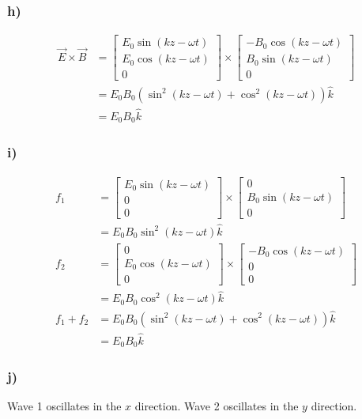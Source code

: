 \documentclass[../homework.tex]{subfiles}
\begin{document}
\subsubsection*{h)}
\begin{align*}
	\vec{E} \times \vec{B} & =
	\begin{bmatrix}
		E_0 \sin (kz - \omega t) \\
		E_0 \cos (kz - \omega t) \\
		0
	\end{bmatrix} \times
	\begin{bmatrix}
		-B_0 \cos (kz - \omega t) \\
		B_0 \sin (kz - \omega t)  \\
		0
	\end{bmatrix}                                                                               \\
	                       & = E_0 B_0 \left(\sin^2 (kz - \omega t) + \cos^2 (kz - \omega t)\right) \hat{k} \\
	                       & = E_0 B_0 \hat{k}
\end{align*}

\subsubsection*{i)}
\begin{align*}
	f_1       & =
	\begin{bmatrix}
		E_0 \sin (kz - \omega t) \\
		0                        \\
		0
	\end{bmatrix} \times
	\begin{bmatrix}
		0                        \\
		B_0 \sin (kz - \omega t) \\
		0
	\end{bmatrix}                                                                  \\
	          & = E_0 B_0 \sin^2 (kz - \omega t) \hat{k}                                       \\
	f_2       & =
	\begin{bmatrix}
		0                        \\
		E_0 \cos (kz - \omega t) \\
		0
	\end{bmatrix} \times
	\begin{bmatrix}
		-B_0 \cos (kz - \omega t) \\
		0                         \\
		0
	\end{bmatrix}                                                                 \\
	          & = E_0 B_0 \cos^2 (kz - \omega t) \hat{k}                                       \\
	f_1 + f_2 & = E_0 B_0 \left(\sin^2 (kz - \omega t) + \cos^2 (kz - \omega t)\right) \hat{k} \\
	          & = E_0 B_0 \hat{k}
\end{align*}

\subsubsection*{j)}
Wave 1 oscillates in the $x$ direction. Wave 2 oscillates in the $y$ direction.
\end{document}
